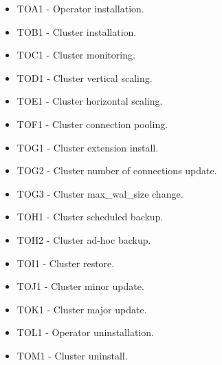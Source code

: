 \begin{itemize}
    \item TOA1 - Operator installation.
    \item TOB1 - Cluster installation.
    \item TOC1 - Cluster monitoring.
    \item TOD1 - Cluster vertical scaling.
    \item TOE1 - Cluster horizontal scaling.
    \item TOF1 - Cluster connection pooling.
    \item TOG1 - Cluster extension install.
    \item TOG2 - Cluster number of connections update.
    \item TOG3 - Cluster max\_wal\_size change.
    \item TOH1 - Cluster scheduled backup.
    \item TOH2 - Cluster ad-hoc backup.
    \item TOI1 - Cluster restore.
    \item TOJ1 - Cluster minor update.
    \item TOK1 - Cluster major update.
    \item TOL1 - Operator uninstallation.
    \item TOM1 - Cluster uninstall.
\end{itemize}




